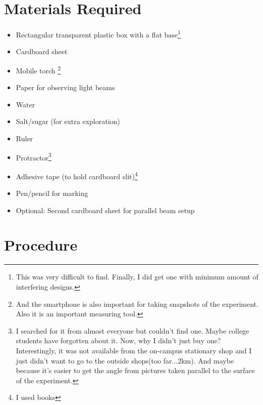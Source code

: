 \documentclass[twocolumn,11pt]{article}
\begin{document}
\section{Materials Required}
\begin{itemize}
    \item Rectangular transparent plastic box with a flat base\footnote{This was very difficult to find. Finally, I did get one with minimum amount of interfering designs.}
    \item Cardboard sheet
    \item Mobile torch \footnote{And the smartphone is also important for taking snapshots of the experiment. Also it is an important measuring tool.}
    \item Paper for observing light beams
    \item Water
    \item Salt/sugar (for extra exploration)
    \item Ruler
    \item Protractor\footnote{I searched for it from almost everyone but couldn't find one. Maybe college students have forgotten about it. Now, why I didn't just buy one? Interestingly, it was not available from the on-campus stationary shop and I just didn't want to go to the outside shops(too far...2km). And maybe because it's easier to get the angle from pictures taken parallel to the surface of the experiment. }
    \item Adhesive tape (to hold cardboard slit)\footnote{I used books}
    \item Pen/pencil for marking
    \item Optional: Second cardboard sheet for parallel beam setup
\end{itemize}

\section{Procedure}
\end{document}
